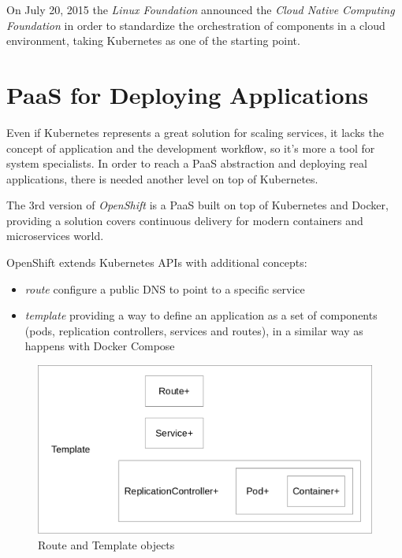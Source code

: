 On July 20, 2015 the \textit{Linux Foundation} announced the \textit{Cloud Native Computing Foundation}\cite{CloudNativeComputingFoundation} in order to standardize the orchestration of components in a cloud environment, taking Kubernetes as one of the starting point.

\section{PaaS for Deploying Applications}\label{paas-for-deploying-applications}

Even if Kubernetes represents a great solution for scaling services, it lacks the concept of application and
the development workflow, so it's more a tool for system specialists. In order to reach a PaaS abstraction and deploying real applications, there is needed another level on top of Kubernetes.

The 3rd version of \textit{OpenShift} is a PaaS built on top of Kubernetes and Docker, providing a solution covers continuous delivery for modern containers and microservices world.

OpenShift extends Kubernetes APIs with additional concepts:

\begin{itemize}
\item \textit{route} configure a public DNS to point to a specific service
\item \textit{template} providing a way to define an application as a set of components (pods, replication controllers, services and routes), in a similar way as happens with Docker Compose
\end{itemize}

\begin{figure}[htbp]
\centering
\includegraphics{media/ch5-template.png}
\caption{Route and Template objects}
\end{figure}

